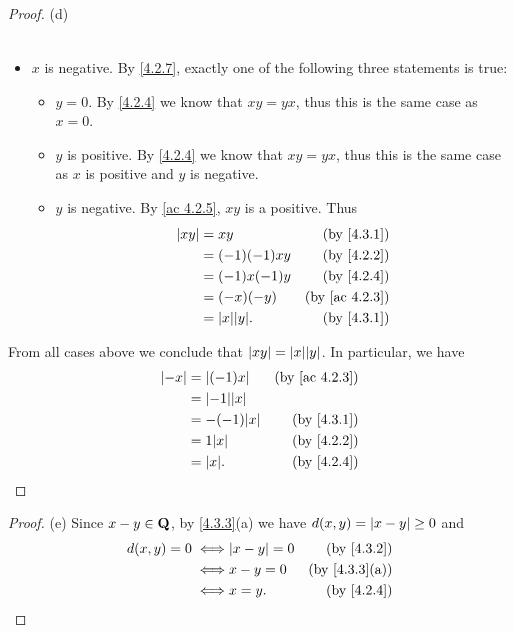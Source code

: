 \begin{proof}{(d)}
\begin{itemize}
\begin{itemize}
\begin{align*}
                  \end{align*}
          \end{itemize}
    \item \(x\) is negative.
          By \cref{4.2.7}, exactly one of the following three statements is true:
          \begin{itemize}
            \item \(y = 0\).
                  By \cref{4.2.4} we know that \(xy = yx\), thus this is the same case as \(x = 0\).
            \item \(y\) is positive.
                  By \cref{4.2.4} we know that \(xy = yx\), thus this is the same case as \(x\) is positive and \(y\) is negative.
            \item \(y\) is negative.
                  By \cref{ac 4.2.5}, \(xy\) is a positive.
                  Thus
                  \begin{align*}
                    \abs{xy} & = xy               & \text{(by \cref{4.3.1})}    \\
                             & = (-1)(-1)xy       & \text{(by \cref{4.2.2})}    \\
                             & = (-1)x(-1)y       & \text{(by \cref{4.2.4})}    \\
                             & = (-x)(-y)         & \text{(by \cref{ac 4.2.3})} \\
                             & = \abs{x} \abs{y}. & \text{(by \cref{4.3.1})}
                  \end{align*}
          \end{itemize}
  \end{itemize}
  From all cases above we conclude that \(\abs{xy} = \abs{x} \abs{y}\).
  In particular, we have
  \begin{align*}
    \abs{-x} & = \abs{(-1)x}      & \text{(by \cref{ac 4.2.3})} \\
             & = \abs{-1} \abs{x}                               \\
             & = -(-1) \abs{x}    & \text{(by \cref{4.3.1})}    \\
             & = 1 \abs{x}        & \text{(by \cref{4.2.2})}    \\
             & = \abs{x}.         & \text{(by \cref{4.2.4})}
  \end{align*}
\end{proof}

\begin{proof}{(e)}
  Since \(x - y \in \mathbf{Q}\), by \cref{4.3.3}(a) we have \(d(x, y) = \left\lvert x - y\right\rvert \geq 0\) and
  \begin{align*}
    d(x, y) = 0
    \iff & \abs{x - y} = 0 & \text{(by \cref{4.3.2})}    \\
    \iff & x - y = 0       & \text{(by \cref{4.3.3}(a))} \\
    \iff & x = y.          & \text{(by \cref{4.2.4})}
  \end{align*}
\end{proof}

